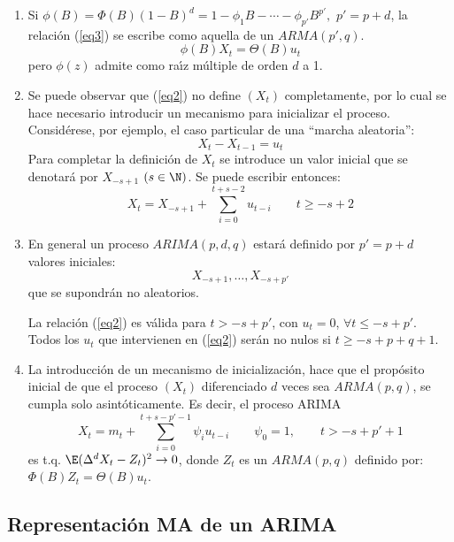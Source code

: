 \begin{observacion}
\begin{enumerate}
\item Si $\phi (B)=\Phi \left( B \right)(1-B)^{d}=1-\phi_{1} B-\cdots-\phi_{p'} B^{p'},$ $p'=p+d$, la relaci\'{o}n (\ref{eq3}) se escribe como aquella de un $ARMA(p',q)$.
\[
\phi (B)X_{t} =\Theta (B)u_{t} 
\]
pero $\phi (z)$ admite como ra\'{\i}z m\'{u}ltiple de orden $d$ a 1.

\item Se puede observar que (\ref{eq2}) no define $(X_{t})$ completamente, por lo cual se hace necesario introducir un mecanismo para inicializar el proceso. Consid\'{e}rese, por ejemplo, el caso particular de una ``marcha aleatoria'':
\[
X_{t} -X_{t-1} =u_{t} 
\]
Para completar la definici\'{o}n de $X_{t}$ se introduce un valor inicial que 
se denotar\'{a} por $X_{-s+1}$ $(s\in \N)$. Se puede escribir entonces:
\[
X_{t} =X_{-s+1} +\sum_{i=0}^{t+s-2} {u_{t-i} } 
\qquad
t\ge -s+2
\]

\item En general un proceso $ARIMA(p,d,q)$ estar\'{a} definido por $p'=p+d$ valores iniciales:
\[
X_{-s+1} ,\ldots,X_{-s+p'} 
\]
que se supondr\'{a}n no aleatorios.

La relaci\'{o}n (\ref{eq2}) es v\'{a}lida para $t>-s+p'$, con $u_{t}=0$, $\forall 
t\le -s+p'$. Todos los $u_{t}$ que intervienen en (\ref{eq2}) ser\'{a}n no nulos 
si $t\ge - s+p+q+1$.

\item La introducci\'{o}n de un mecanismo de inicializaci\'{o}n, hace que el prop\'{o}sito inicial de que el proceso $(X_{t})$ diferenciado $d$ veces sea $ARMA (p,q)$, se cumpla solo asint\'{o}ticamente. Es decir, el proceso ARIMA
\[
X_{t} =m_{t} +\sum_{i=0}^{t+s-p'-1} {\psi_{i} u_{t-i} } 
\qquad
\psi_{0} =1,
\qquad
t>-s+p'+1
\]
es t.q. $\E(\Delta^{d}X_{t} -Z_{t} )^{2}\to 0$, donde $Z_{t} $ es un $ARMA 
(p,q)$ definido por: $\Phi (B)Z_{t} =\Theta (B)u_{t} $.
\end{enumerate}
\end{observacion}

\subsection{Representaci\'{o}n MA de un ARIMA}

